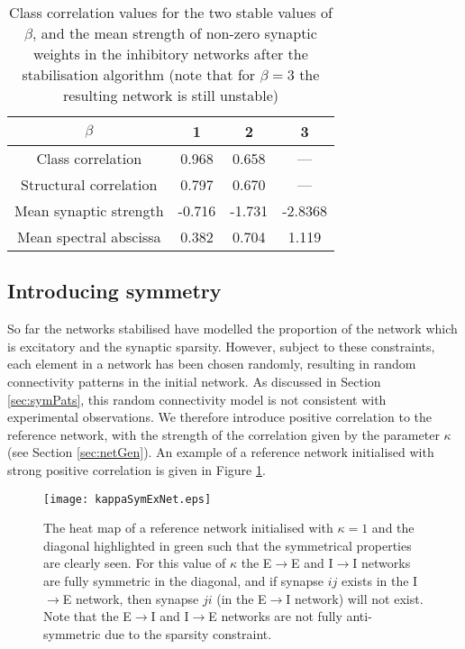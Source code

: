 \documentclass[12pt, a4paper]{article}
\begin{document}
\begin{table}
    \centering
            \begin{tabular}{|c | c c c|}
                \hline
                   $\beta$              &  1       &    2    &     3 \\
                \hline
                Class correlation      &    0.968  &  0.658   &   ---  \\
                Structural correlation &   0.797   &  0.670   &    ---  \\
                Mean synaptic strength &   -0.716  &  -1.731  & -2.8368 \\  
                Mean spectral abscissa &  0.382    &  0.704   &    1.119 \\
                \hline
            \end{tabular}
            \caption{Class correlation values for the two stable values of $\beta$, and the mean strength of non-zero synaptic weights in the inhibitory networks after the stabilisation algorithm (note that for $\beta = 3$ the resulting network is still unstable)}
            \label{tab:bCorr}
\end{table}



\FloatBarrier
\subsection{Introducing symmetry}
\label{sec:symIntro}
So far the networks stabilised have modelled the proportion of the network which is excitatory and the synaptic sparsity.  However, subject to these constraints, each element in a network has been chosen randomly, resulting in random connectivity patterns in the initial network.  As discussed in Section \ref{sec:symPats}, this random connectivity model is not consistent with experimental observations.  We therefore introduce positive correlation to the reference network, with the strength of the correlation given by the parameter $\kappa$ (see Section \ref{sec:netGen}).  An example of a reference network initialised with strong positive correlation is given in Figure \ref{fig:k1refNet}.

\begin{figure}
    \texttt{[image: kappaSymExNet.eps]}
    \caption{The heat map of a reference network initialised with $\kappa = 1$ and the diagonal highlighted in green such that the symmetrical properties are clearly seen.  For this value of $\kappa$ the E$\rightarrow$E and I$\rightarrow$I networks are fully symmetric in the diagonal, and if synapse $ij$ exists in the I$\rightarrow$E network, then synapse $ji$ (in the E$\rightarrow$I network) will not exist.  Note that the E$\rightarrow$I and I$\rightarrow$E networks are not fully anti-symmetric due to the sparsity constraint.}
    \label{fig:k1refNet}
\end{figure}
\end{document}
